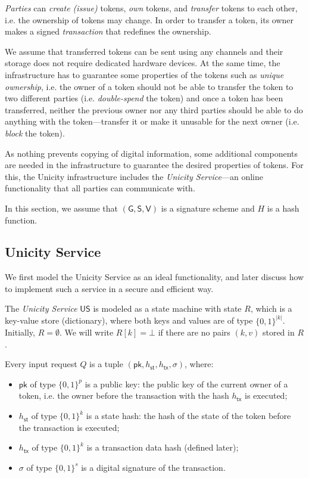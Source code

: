 \documentclass{article}
\newcommand{\bits}[1]{\{0,1\}^{#1}}
\newcommand{\keygen}[0]{\mathsf{G}}
\newcommand{\sig}[0]{\mathsf{S}}
\newcommand{\sigver}[0]{\mathsf{V}}
\newcommand{\pubkey}[0]{\mathsf{pk}}
\newcommand{\unisrv}[0]{\mathsf{US}}
\newcommand{\sthash}[0]{h_\mathsf{st}}
\newcommand{\txhash}[0]{h_\mathsf{tx}}
\begin{document}
\emph{Parties} can \emph{create (issue)} tokens, \emph{own} tokens, and \emph{transfer} tokens to each other, i.e. the ownership of tokens may change. In order to transfer a token, its owner makes a signed \emph{transaction} that redefines the ownership.

We assume that transferred tokens can be sent using any channels and their storage does not require dedicated hardware devices. At the same time, the infrastructure has to guarantee some properties of the tokens such as \emph{unique ownership}, i.e. the owner of a token should not be able to transfer the token to two different parties (i.e. \emph{double-spend} the token) and once a token has been transferred, neither the previous owner nor any third parties should be able to do anything with the token---transfer it or make it unusable for the next owner (i.e. \emph{block} the token).

As nothing prevents copying of digital information, some additional components are needed in the infrastructure to guarantee the desired properties of tokens. For this, the Unicity infrastructure includes the \emph{Unicity Service}---an online functionality that all parties can communicate with.


In this section, we assume that $(\keygen, \sig, \sigver)$ is a signature scheme and $H$ is a hash function.

\subsection{Unicity Service}

We first model the Unicity Service as an ideal functionality, and later discuss how to implement such a service in a secure and efficient way.

The \emph{Unicity Service} $\unisrv$ is modeled as a state machine with state $R$, which is a key-value store (dictionary), where both keys and values are of type $\bits{|k|}$. Initially, $R = \emptyset$. We will write $R[k] = \bot$ if there are no pairs $(k, v)$ stored in $R$.

Every input request $Q$ is a tuple $(\pubkey, \sthash, \txhash, \sigma)$, where:
\begin{itemize}
\item $\pubkey$ of type $\bits{p}$ is a public key: the public key of the current owner of a token, i.e. the owner before the transaction with the hash $\txhash$ is executed;
\item $\sthash$ of type $\bits{k}$ is a state hash: the hash of the state of the token before the transaction is executed;
\item $\txhash$ of type $\bits{k}$ is a transaction data hash (defined later);
\item $\sigma$ of type $\bits{s}$ is a digital signature of the transaction.
\end{itemize}
\end{document}
